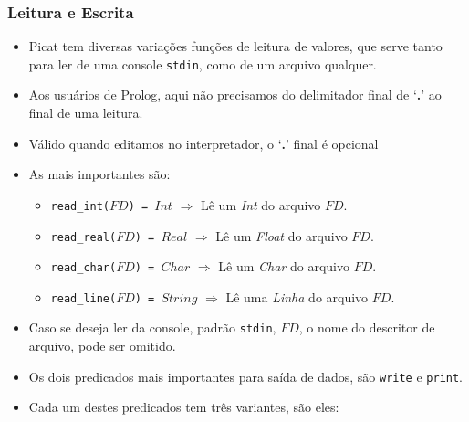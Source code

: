 \begin{frame}[c,allowframebreaks]

\frametitle{Leitura e Escrita}    

\begin{itemize}
        
\item Picat tem diversas variações  funções de leitura de valores,
        que serve tanto para ler de uma console \texttt{stdin},
        como de um arquivo qualquer.
        
\item Aos usuários de Prolog, aqui não precisamos do delimitador
final de `\textbf{.}'   ao final de uma leitura. 

\item Válido quando editamos no interpretador, o `\textbf{.}' final é opcional
        
\framebreak        
\item As mais importantes são:

\begin{itemize}
  
  \item \texttt{read\_int($FD$) = $Int$} $\Rightarrow$ Lê um \textit{Int} do 
  arquivo $FD$.
  
  \item \texttt{read\_real($FD$) = $Real$} $\Rightarrow$ Lê um \textit{Float} do 
  arquivo $FD$.
  
  \item \texttt{read\_char($FD$) = $Char$} $\Rightarrow$ Lê um \textit{Char} do 
  arquivo $FD$.
  
  \item \texttt{read\_line($FD$) = $String$} $\Rightarrow$ Lê uma \textit{Linha} 
  do arquivo $FD$.
  
\end{itemize}

\item Caso se deseja ler da console, padrão \texttt{stdin}, $FD$, o nome do descritor de arquivo,  pode ser omitido.

\framebreak

\item Os dois predicados mais importantes para saída de dados, são 
\texttt{write} e \texttt{print}.

\item Cada um destes predicados tem três variantes, são eles:

\begin{itemize}


\end{itemize}
\end{itemize}
\end{frame}
